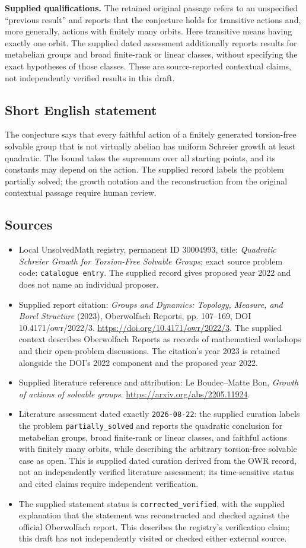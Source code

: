 \documentclass[11pt]{article}
\begin{document}
\textbf{Supplied qualifications.} The retained original passage refers to an unspecified ``previous result'' and reports that the conjecture holds for transitive actions and, more generally, actions with finitely many orbits. Here transitive means having exactly one orbit. The supplied dated assessment additionally reports results for metabelian groups and broad finite-rank or linear classes, without specifying the exact hypotheses of those classes. These are source-reported contextual claims, not independently verified results in this draft.
\subsection{Short English statement}
The conjecture says that every faithful action of a finitely generated torsion-free solvable group that is not virtually abelian has uniform Schreier growth at least quadratic. The bound takes the supremum over all starting points, and its constants may depend on the action. The supplied record labels the problem partially solved; the growth notation and the reconstruction from the original contextual passage require human review.
\subsection{Sources}
\begin{itemize}
\item Local UnsolvedMath registry, permanent ID \(30004993\), title: \emph{Quadratic Schreier Growth for Torsion-Free Solvable Groups}; exact source problem code: \texttt{catalogue entry}. The supplied record gives proposed year 2022 and does not name an individual proposer.
\item Supplied report citation: \emph{Groups and Dynamics: Topology, Measure, and Borel Structure} (2023), Oberwolfach Reports, pp. 107--169, DOI 10.4171/owr/2022/3. \url{https://doi.org/10.4171/owr/2022/3}. The supplied context describes Oberwolfach Reports as records of mathematical workshops and their open-problem discussions. The citation's year 2023 is retained alongside the DOI's 2022 component and the proposed year 2022.
\item Supplied literature reference and attribution: Le Boudec--Matte Bon, \emph{Growth of actions of solvable groups}. \url{https://arxiv.org/abs/2205.11924}.
\item Literature assessment dated exactly \texttt{2026-08-22}: the supplied curation labels the problem \texttt{partially\_solved} and reports the quadratic conclusion for metabelian groups, broad finite-rank or linear classes, and faithful actions with finitely many orbits, while describing the arbitrary torsion-free solvable case as open. This is supplied dated curation derived from the OWR record, not an independently verified literature assessment; its time-sensitive status and cited claims require independent verification.
\item The supplied statement status is \texttt{corrected\_verified}, with the supplied explanation that the statement was reconstructed and checked against the official Oberwolfach report. This describes the registry's verification claim; this draft has not independently visited or checked either external source.
\end{itemize}
\end{document}
